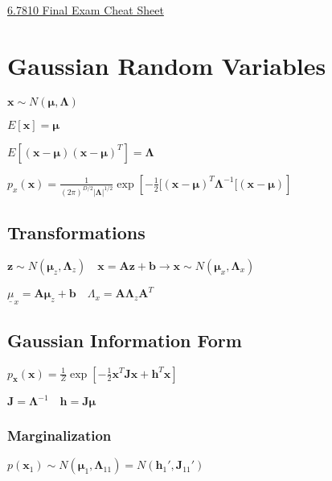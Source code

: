 \documentclass[9pt]{article}
\begin{document}
\raggedright
\begin{multicols}{2}


\setlength{\premulticols}{1pt}
\setlength{\postmulticols}{1pt}
\setlength{\multicolsep}{1pt}
\setlength{\columnsep}{2pt}

\begin{center}
     \Large{\underline{6.7810 Final Exam Cheat Sheet}} \\
\end{center}

\section{Gaussian Random Variables}
$\mathbf{x} \sim N(\mathbf{\mu}, \mathbf{\Lambda})$

$E[\mathbf{x}] = \mathbf{\mu}$

$E[(\mathbf{x} - \mathbf{\mu})(\mathbf{x} - \mathbf{\mu})^T] = \mathbf{\Lambda} $

$p_x(\mathbf{x}) = \frac{1}{(2\pi)^{D/2}|\mathbf{\Lambda}|^{1/2}} \exp \left [-\frac{1}{2}[(\mathbf{x} - \mathbf{\mu})^T \mathbf{\Lambda}^{-1}[(\mathbf{x} - \mathbf{\mu})\right]$
\subsection{Transformations}
$\mathbf{z} \sim N(\mathbf{\mu}_z, \mathbf{\Lambda}_z) \quad \mathbf{x} = \mathbf{A}\mathbf{z} + \mathbf{b} \rightarrow \mathbf{x} \sim N(\mathbf{\mu}_x, \mathbf{\Lambda}_x)$

$\underline{\mu}_x = \mathbf{A} \mathbf{\mu}_z + \mathbf{b} \quad \Lambda_x = \mathbf{A} \mathbf{\Lambda}_z \mathbf{A}^T$

\subsection{Gaussian Information Form}
$p_{\mathbf{x}}(\mathbf{x}) = \frac{1}{Z} \exp \left[-\frac{1}{2}\mathbf{x}^T\mathbf{J}\mathbf{x} + \mathbf{h}^T\mathbf{x}\right]$

$\mathbf{J} = \mathbf{\Lambda}^{-1} \quad \mathbf{h} = \mathbf{J}\mathbf{\mu}$

\subsubsection{Marginalization}
$p(\mathbf{x}_1) \sim N(\mathbf{\mu}_1, \mathbf{\Lambda}_{11}) = 
N(\mathbf{h}_1\prime, \mathbf{J}_{11}\prime)$


\end{multicols}
\end{document}
